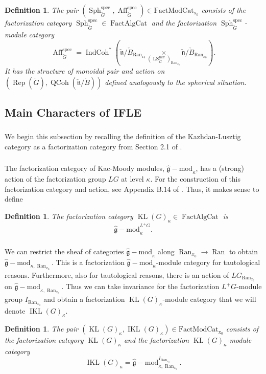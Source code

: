\documentclass[10pt]{amsart}
\newtheorem{defn}[subsubsection]{Definition}
\theoremstyle{remark}
\newcommand{\on}[1]{\operatorname{#1}}
\newcommand{\QCoh}{\on{QCoh}}
\newcommand{\IndCoh}{\on{IndCoh}}
\newcommand{\gmod}{\on{\hat{\mathfrak{g}}-mod}}
\newcommand{\Gcheck}{\check{G}}
\newcommand{\ncheck}{\check{\mathfrak{n}}}
\newcommand{\Bcheck}{\check{B}}
\newcommand{\Ran}{\on{Ran}}
\newcommand{\FactAlgCat}{\on{FactAlgCat}}
\newcommand{\FactModCat}{\on{FactModCat_{x_0}}}
\newcommand{\sssec}[1]{\subsubsection{}}
\begin{document}
\begin{defn}
    The pair $(\on{Sph}_{\Gcheck}^{\on{spec}}, \on{Aff}_{\Gcheck}^{\on{spec}}) \in \FactModCat$ consists of the factorization category $\on{Sph}_{\Gcheck}^{\on{spec}} \in \FactAlgCat$ and the factorization $\on{Sph}_{\Gcheck}^{\on{spec}}$-module category
    $$
    \on{Aff}_{\Gcheck}^{\on{spec}} = \IndCoh^*(\ncheck/\Bcheck_{\Ran_{x_0}} \underset{(\on{LS}_{\Gcheck}^{\on{mer}})_{\Ran_{x_0}}}{\times} \ncheck/\Bcheck_{\Ran_{x_0}}).
    $$
    It has the structure of monoidal pair and action on $(\on{Rep}(\Gcheck), \QCoh(\ncheck/\Bcheck))$ defined analogously to the spherical situation.
\end{defn}

\subsection{Main Characters of IFLE} \label{Main Characters of IFLE}

\sssec{}
We begin this subsection by recalling the definition of the Kazhdan-Lusztig category as a factorization category from Section 2.1 of \cite{GLC2}.

\sssec{}
The factorization category of Kac-Moody modules, $\gmod_{\kappa}$, has a (strong) action of the factorization group $LG$ at level $\kappa$. For the construction of this factorization category and action, see Appendix B.14 of \cite{GLC2}. Thus, it makes sense to define

\begin{defn}
    The factorization category $\on{KL}(G)_{\kappa} \in \FactAlgCat$ is
    $$
        \gmod_{\kappa}^{L^+G}.
    $$
\end{defn}

\sssec{}
We can restrict the sheaf of categories $\gmod_{\kappa}$ along $\Ran_{x_0} \to \Ran$ to obtain $\gmod_{\kappa, \Ran_{x_0}}$. This is a factorization $\gmod_{\kappa}$-module category for tautological reasons. Furthermore, also for tautological reasons, there is an action of $LG_{\Ran_{x_0}}$ on $\gmod_{\kappa, \Ran_{x_0}}$. Thus we can take invariance for the factorization $L^+G$-module group $I_{\Ran_{x_0}}$ and obtain a factorization $\on{KL}(G)_{\kappa}$-module category that we will denote $\on{IKL}(G)_{\kappa}$.

\begin{defn}
    The pair $(\on{KL}(G)_{\kappa}, \on{IKL}(G)_{\kappa}) \in \FactModCat$ consists of the factorization category $\on{KL}(G)_{\kappa}$ and the factorization $\on{KL}(G)_{\kappa}$-module category
    $$
    \on{IKL}(G)_{\kappa} = \gmod_{\kappa, \Ran_{x_0}}^{I_{\Ran_{x_0}}}.
    $$
\end{defn}
\end{document}
